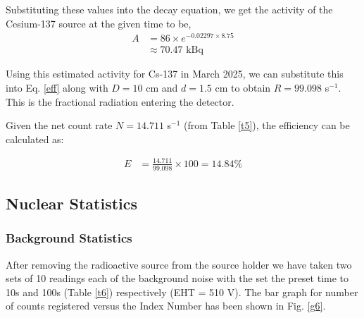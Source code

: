 \noindent Substituting these values into the decay equation, we get the activity of the Cesium-137 source at the
given time to be,
\begin{align*}
    A &= 86 \times e^{-0.02297 \times 8.75}\\
    &\approx 70.47 \text{ kBq}
\end{align*}

Using this estimated activity for Cs-137 in March 2025, we can substitute this into Eq. \ref{eff} along with $D=10$ cm and $d=1.5$ cm to obtain $R = 99.098$ s$^{-1}$. This is the fractional radiation entering the detector.

Given the net count rate $N = 14.711$ s$^{-1}$ (from Table \ref{t5}), the efficiency can be calculated as:

\begin{align*}
    E &= \frac{14.711}{99.098} \times 100 = 14.84\%
\end{align*}

\subsection{Nuclear Statistics}

\subsubsection{Background Statistics}
After removing the radioactive source from the source holder we have taken two sets of 10 readings each of the background noise with the set the preset time to 10s and 100s (Table \ref{t6}) respectively (EHT = 510 V). The bar graph for number of counts registered versus the Index Number has been shown in Fig. \ref{g6}.

